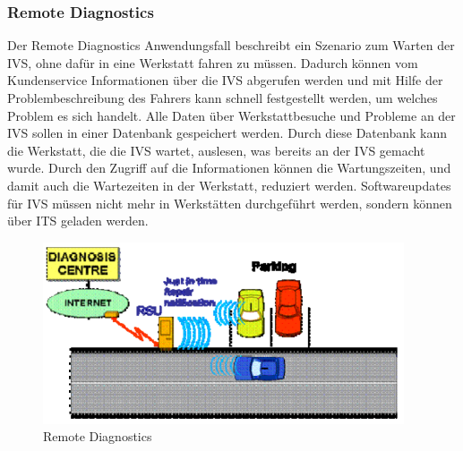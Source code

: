 \subsubsection{Remote Diagnostics}
Der Remote Diagnostics Anwendungsfall beschreibt ein Szenario zum Warten der \ac{IVS}, ohne dafür in eine Werkstatt fahren zu müssen. Dadurch können vom Kundenservice Informationen über die \ac{IVS} abgerufen werden und mit Hilfe der Problembeschreibung des Fahrers kann schnell festgestellt werden, um welches Problem es sich handelt. Alle Daten über Werkstattbesuche und Probleme an der  \ac{IVS} sollen in einer Datenbank gespeichert werden. Durch diese Datenbank kann die Werkstatt, die die \ac{IVS} wartet, auslesen, was bereits an der \ac{IVS} gemacht wurde. Durch den Zugriff auf die Informationen können die Wartungszeiten, und damit auch die Wartezeiten in der Werkstatt, reduziert werden. Softwareupdates für \ac{IVS} müssen nicht mehr in Werkstätten durchgeführt werden, sondern können über \ac{ITS} geladen werden.

\begin{figure}[htbp]
\includegraphics[width=0.95\textwidth]{content/images/06_use_cases/rds.png}
\caption{Remote Diagnostics \cite{etsi102638}}
\label{fig:redia}
\end{figure}
